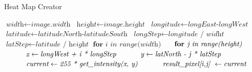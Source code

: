 \documentclass[letterpaper]{article}
\begin{document}
\begin{algorithm}
    \caption{Heat Map Creator}\label{heatMapCreation}
    \begin{algorithmic}[1]
        	 \State $\textit{width} \gets \textit{image.width}$
        	 \State $\textit{height} \gets \textit{image.height}$
        	 \State $\textit{longitude} \gets \textit{longEast-longWest}$
        	 \State $\textit{latitude} \gets \textit{latitudeNorth-latitudeSouth}$
            \State $\textit{longStep} \gets \textit{longitude / widht}$
            \State $\textit{latStep} \gets \textit{latitude / height}$
            \State $\textbf{for } \textit{i in range(width)} $
            \State $\indent \textbf{for } \textit{j in range(height)} $
            \State $\indent \indent \textit{x} \gets \textit{longWest + i * longStep}$
            \State $\indent \indent \textit{y} \gets \textit{latNorth - j * latStep}$
            \State $\indent \indent \textit{current} \gets \textit{255 * get\_intensity(x, y)}$
            \State $\indent \indent \textit{result\_pixel[i,j] } \gets \textit{current}$
        \EndProcedure
    \end{algorithmic}
\end{algorithm}
\end{document}
